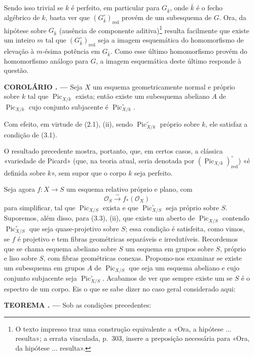 \documentclass[11pt,twoside,openany]{book}
\numberwithin{equation}{section}
\newcommand{\src}[1]{%
  \phantomsection\hypertarget{src:#1}{}%
  \marginpar{\raggedleft\footnotesize\sffamily #1}%
}
\theoremstyle{plain}
\theoremstyle{definition}
\theoremstyle{remark}
\newcommand{\result}[2]{%
  \par\medskip\noindent\textbf{#1%
  \if\relax\detokenize{#2}\relax\else\space#2\fi. ---}\enspace
}
\newcommand{\FgaUnitKey}{frontmatter}
\renewcommand{\src}[1]{%
  \phantomsection\hypertarget{src:\FgaUnitKey:#1}{}%
  \marginpar{\raggedleft\footnotesize\sffamily #1}%
}
\begin{document}
Sendo isso trivial se $k$ é perfeito, em particular para $G_{\bar k}$, onde
$\bar k$ é o fecho algébrico de $k$, basta ver que
$(G_{\bar k}^\circ)_{\mathrm{red}}$ provém de um subesquema de $G$. Ora, da
hipótese sobre $G_{\bar k}$ (ausência de componente aditiva)\footnote{O texto
impresso traz uma construção equivalente a «Ora, a hipótese ... resulta»; a
errata vinculada, p.~303, insere a preposição necessária para «Ora, da hipótese
... resulta».} resulta facilmente que existe um inteiro $m$ tal que
$(G_{\bar k}^\circ)_{\mathrm{red}}$ seja a imagem esquemática do homomorfismo de
elevação à $m$-ésima potência em $G_{\bar k}$. Como esse último homomorfismo
provém do homomorfismo análogo para $G$, a imagem esquemática deste último
responde à questão.

\result{COROLÁRIO}{3.2} Seja $X$ um esquema geometricamente normal e próprio sobre $k$ tal que
$\operatorname{Pic}_{X/k}$ exista; então existe um subesquema abeliano $A$ de
$\operatorname{Pic}_{X/k}$ cujo conjunto subjacente é
$\operatorname{Pic}_{X/k}^\circ$.

Com efeito, em virtude de (2.1), (ii), sendo
$\operatorname{Pic}_{X/k}^\circ$ próprio sobre $k$, ele satisfaz a condição de
(3.1).
\src{237}
O resultado precedente mostra, portanto, que, em certos casos, a clássica
«variedade de Picard» (que, na teoria atual, seria denotada por
$(\operatorname{Pic}_{X/k})_{\mathrm{red}}^\circ$) «é definida sobre $k$»,
sem supor que o corpo $k$ seja perfeito.

Seja agora $f:X\longrightarrow S$ um esquema relativo próprio e plano, com
\[
\mathcal O_S\xrightarrow{\sim}f_*(\mathcal O_X)
\]
para simplificar, tal que $\operatorname{Pic}_{X/S}$ exista e que
$\operatorname{Pic}_{X/S}^\circ$ seja próprio sobre $S$. Suporemos, além
disso, para (3.3), (ii), que existe um aberto de $\operatorname{Pic}_{X/S}$
contendo $\operatorname{Pic}_{X/S}^\circ$ que seja quase-projetivo sobre $S$;
essa condição é satisfeita, como vimos, se $f$ é projetivo e tem fibras
geométricas separáveis e irredutíveis. Recordemos que se chama esquema
abeliano sobre $S$ um esquema em grupos sobre $S$, próprio e liso sobre
$S$, com fibras geométricas conexas. Propomo-nos
examinar se existe um subesquema em grupos $A$ de
$\operatorname{Pic}_{X/S}$ que seja um esquema abeliano e cujo conjunto
subjacente seja $\operatorname{Pic}_{X/S}^\circ$. Acabamos de ver que sempre
existe um se $S$ é o espectro de um corpo. Eis o que se sabe dizer no caso
geral considerado aqui:

\result{TEOREMA}{3.3} Sob as condições precedentes:
\end{document}
